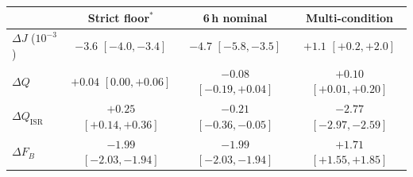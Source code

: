 \begin{tabular}{@{}lccc@{}}
\toprule
 & Strict floor$^\ast$ & 6\,h nominal & Multi-condition\\
\midrule
$\Delta J$ ($10^{-3}$) & $-3.6$ {\tiny$[-4.0,-3.4]$} & $-4.7$ {\tiny$[-5.8,-3.5]$} & $+1.1$ {\tiny$[+0.2,+2.0]$}\\
$\Delta Q$ & $+0.04$ {\tiny$[0.00,+0.06]$} & $-0.08$ {\tiny$[-0.19,+0.04]$} & $+0.10$ {\tiny$[+0.01,+0.20]$}\\
$\Delta Q_{\mathrm{ISR}}$ & $+0.25$ {\tiny$[+0.14,+0.36]$} & $-0.21$ {\tiny$[-0.36,-0.05]$} & $-2.77$ {\tiny$[-2.97,-2.59]$}\\
$\Delta F_B$ & $-1.99$ {\tiny$[-2.03,-1.94]$} & $-1.99$ {\tiny$[-2.03,-1.94]$} & $+1.71$ {\tiny$[+1.55,+1.85]$}\\
\bottomrule
\end{tabular}
